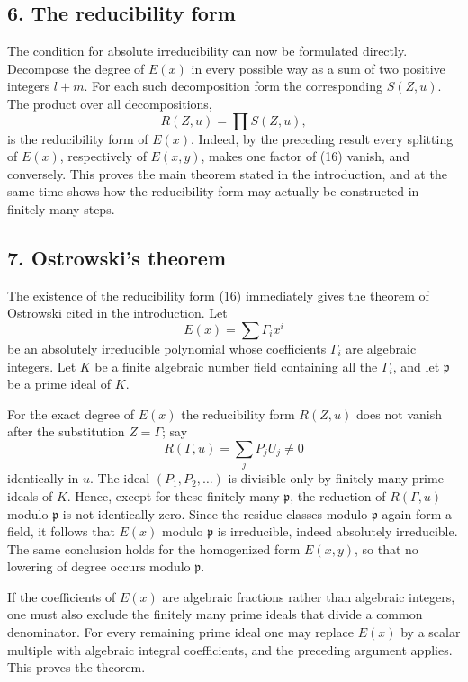 \documentclass[11pt]{article}
\begin{document}
\subsection*{6. The reducibility form}

The condition for absolute irreducibility can now be formulated directly. Decompose the degree of $E(x)$ in every possible way as a sum of two positive integers $l+m$. For each such decomposition form the corresponding $S(Z,u)$. The product over all decompositions,
\begin{equation}
  R(Z,u)=\prod S(Z,u),                                            \tag{16}
\end{equation}
is the reducibility form of $E(x)$. Indeed, by the preceding result every splitting of $E(x)$, respectively of $E(x,y)$, makes one factor of (16) vanish, and conversely. This proves the main theorem stated in the introduction, and at the same time shows how the reducibility form may actually be constructed in finitely many steps.

\subsection*{7. Ostrowski's theorem}

The existence of the reducibility form (16) immediately gives the theorem of Ostrowski cited in the introduction. Let
\[
  E(x)=\sum \Gamma_i x^i
\]
be an absolutely irreducible polynomial whose coefficients $\Gamma_i$ are algebraic integers. Let $K$ be a finite algebraic number field containing all the $\Gamma_i$, and let $\mathfrak p$ be a prime ideal of $K$.

For the exact degree of $E(x)$ the reducibility form $R(Z,u)$ does not vanish after the substitution $Z=\Gamma$; say
\[
  R(\Gamma,u)=\sum_j P_j U_j\ne 0
\]
identically in $u$. The ideal $(P_1,P_2,\ldots)$ is divisible only by finitely many prime ideals of $K$. Hence, except for these finitely many $\mathfrak p$, the reduction of $R(\Gamma,u)$ modulo $\mathfrak p$ is not identically zero. Since the residue classes modulo $\mathfrak p$ again form a field, it follows that $E(x)$ modulo $\mathfrak p$ is irreducible, indeed absolutely irreducible. The same conclusion holds for the homogenized form $E(x,y)$, so that no lowering of degree occurs modulo $\mathfrak p$.

If the coefficients of $E(x)$ are algebraic fractions rather than algebraic integers, one must also exclude the finitely many prime ideals that divide a common denominator. For every remaining prime ideal one may replace $E(x)$ by a scalar multiple with algebraic integral coefficients, and the preceding argument applies. This proves the theorem.
\end{document}

